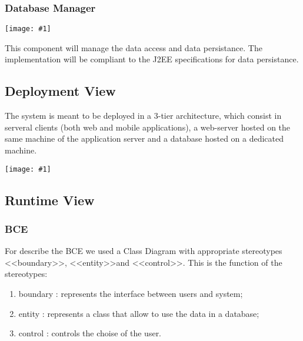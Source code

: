 \documentclass[11pt, a4paper,titlepage]{article}
\newcommand{\image}[1]{
	\begin{center}
		\noindent \texttt{[image: \#1]}
	\end{center}
	}
\begin{document}
 \subsubsection{Database Manager} 
	\image{diagram_class_database.png}
 This component will manage the data access and data persistance. The implementation will be compliant to the J2EE specifications for data persistance.
	
\subsection{Deployment View}
The system is meant to be deployed in a 3-tier architecture, which consist in serveral clients (both web and mobile applications), a web-server hosted on the same machine of the application server and a database hosted on a dedicated machine.
\image{diagram_deployment.png}


\subsection{Runtime View}
\subsubsection{BCE}
For describe the BCE we used a Class Diagram with appropriate stereotypes \textless \textless boundary\textgreater \textgreater , \textless \textless entity\textgreater \textgreater  and \textless \textless control\textgreater \textgreater .
This is the function of the stereotypes:
\begin{enumerate}
	\item 	boundary : represents the interface between users and system;
	\item 	entity : represents a class that allow to use the data in a database;
	\item 	control : controls the choise of the user.
\end{enumerate}
\end{document}

